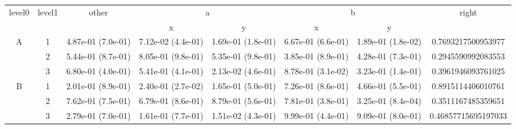 \begin{tabular}{cccccccc}
\toprule
\multirow{2}{*}{level0} & \multirow{2}{*}{level1}& \multirow{2}{*}{other}&\multicolumn{2}{c}{a}&\multicolumn{2}{c}{b}& \multirow{2}{*}{right}\tabularnewline
\cmidrule(lr){4-5}
\cmidrule(lr){6-7}
&&&x&y&x&y\tabularnewline
\midrule
\multirow{3}{*}{A}&1& 4.87e-01 (7.0e-01)& 7.12e-02 (4.4e-01)& 1.69e-01 (1.8e-01)& 6.67e-01 (6.6e-01)& 1.89e-01 (1.8e-02)& 0.7693217500953977\tabularnewline
&2& 5.44e-01 (8.7e-01)& 8.05e-01 (9.8e-01)& 5.35e-01 (9.8e-01)& 3.85e-01 (8.9e-01)& 4.28e-01 (7.3e-01)& 0.2945590992083553\tabularnewline
&3& 6.80e-01 (4.0e-01)& 5.41e-01 (4.1e-01)& 2.13e-02 (4.6e-01)& 8.78e-01 (3.1e-02)& 3.23e-01 (1.4e-01)& 0.3961946093761025\tabularnewline
\midrule
\multirow{3}{*}{B}&1& 2.01e-01 (8.9e-01)& 2.40e-01 (2.7e-02)& 1.65e-01 (5.0e-01)& 7.26e-01 (8.6e-01)& 4.66e-01 (5.5e-01)& 0.8915114406010761\tabularnewline
&2& 7.62e-01 (7.5e-01)& 6.79e-01 (8.6e-01)& 8.79e-01 (5.6e-01)& 7.81e-01 (3.8e-01)& 3.25e-01 (8.4e-04)& 0.3511167485359651\tabularnewline
&3& 2.79e-01 (7.0e-01)& 1.61e-01 (7.7e-01)& 1.51e-02 (4.3e-01)& 9.99e-01 (4.4e-01)& 9.09e-01 (8.0e-01)& 0.46857715695197033\tabularnewline
\bottomrule
\end{tabular}
